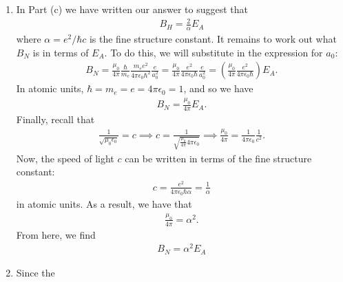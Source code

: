\documentclass{article}
\theoremstyle{definition}
\newcommand{\al}{\alpha}
\newcommand{\f}[2]{\frac{#1}{#2}}
\newcommand{\lp}{\left(}
\newcommand{\rp}{\right)}
\begin{document}
\begin{enumerate}[label=\alph*)]
	\item In Part (c) we have written our answer to suggest that 
	\begin{align*}
	\boxed{B_H = \f{2}{\al}E_A}
	\end{align*}
	where $\al = e^2/\hbar c$ is the fine structure constant. It remains to work out what $B_N$ is in terms of $E_A$. To do this, we will substitute in the expression for $a_0$: 
	\begin{align*}
	B_N = \f{\mu_0 }{4\pi } \f{\hbar}{m_e} \f{m_e e^2}{4\pi \epsilon_0 \hbar^2}   \f{e}{a_0^2} = \f{\mu_0 }{4\pi }  \f{e^2}{4\pi \epsilon_0 \hbar}   \f{e}{a_0^2} = \lp \f{\mu_0 }{4\pi }  \f{e^2}{4\pi \epsilon_0 \hbar}  \rp E_A. 
	\end{align*}
	In atomic units, $\hbar = m_e = e = 4\pi\epsilon_0 = 1$, and so we have
	\begin{align*}
	B_N = \f{\mu_0}{4\pi} E_A.
	\end{align*}
	Finally, recall that
	\begin{align*}
	\f{1}{\sqrt{\mu_0 \epsilon_0}} = c \implies c = \f{1}{\sqrt{\f{\mu_0}{4\pi} 4\pi \epsilon_0}} \implies \f{\mu_0}{4\pi} = \f{1}{4\pi \epsilon_0 } \f{1}{c^2}.
	\end{align*}
	Now, the speed of light $c$ can be written in terms of the fine structure constant:
	\begin{align*}
	c = \f{e^2}{4\pi \epsilon_0 \hbar \al} = \f{1}{\al}
	\end{align*}
	in atomic units. As a result, we have that
	\begin{align*}
	\f{\mu_0}{4\pi} = \al^2.
	\end{align*}
	From here, we find  
	\begin{align*}
	\boxed{B_N = \al^2 E_A}
	\end{align*}
	
	
	\item Since the 
\end{enumerate}
\end{document}
